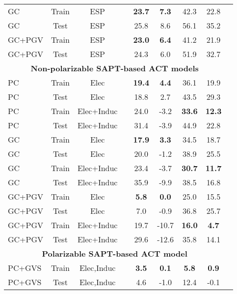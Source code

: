 \begin{table}[htb]
\begin{tabular}{lcccccccc}
GC & Train &ESP &  & \textbf{23.7} & \textbf{7.3} & 42.3 & 22.8 \\
GC & Test &ESP &  & 25.8 & 8.6 & 56.1 & 35.2 \\
GC+PGV & Train &ESP &  & \textbf{23.0} & \textbf{6.4} & 41.2 & 21.9 \\
GC+PGV & Test &ESP &  & 24.3 & 6.0 & 51.9 & 32.7 \\
\hline
\multicolumn{8}{c}{\bf Non-polarizable SAPT-based ACT models}\\
PC & Train &Elec &  & \textbf{19.4} & \textbf{4.4} & 36.1 & 19.9 \\
PC & Test &Elec &  & 18.8 & 2.7 & 43.5 & 29.3 \\
PC & Train &Elec+Induc &  & 24.0 & -3.2 & \textbf{33.6} & \textbf{12.3} \\
PC & Test &Elec+Induc &  & 31.4 & -3.9 & 44.9 & 22.8 \\
GC & Train &Elec &  & \textbf{17.9} & \textbf{3.3} & 34.5 & 18.7 \\
GC & Test &Elec &  & 20.0 & -1.2 & 38.9 & 25.5 \\
GC & Train &Elec+Induc &  & 23.4 & -3.7 & \textbf{30.7} & \textbf{11.7} \\
GC & Test &Elec+Induc &  & 35.9 & -9.9 & 38.5 & 16.8 \\
GC+PGV & Train &Elec &  & \textbf{5.8} & \textbf{0.0} & 25.0 & 15.5 \\
GC+PGV & Test &Elec &  & 7.0 & -0.9 & 36.8 & 25.7 \\
GC+PGV & Train &Elec+Induc &  & 19.7 & -10.7 & \textbf{16.0} & \textbf{4.7} \\
GC+PGV & Test &Elec+Induc &  & 29.6 & -12.6 & 35.8 & 14.1 \\
\hline
\multicolumn{8}{c}{\bf Polarizable SAPT-based ACT model}\\
PC+GVS & Train &Elec,Induc &  & \textbf{3.5} & \textbf{0.1} & \textbf{5.8} & \textbf{0.9} \\
PC+GVS & Test &Elec,Induc &  & 4.6 & -1.0 & 12.4 & -0.1 \\
\hline
\end{tabular}
\end{table}
